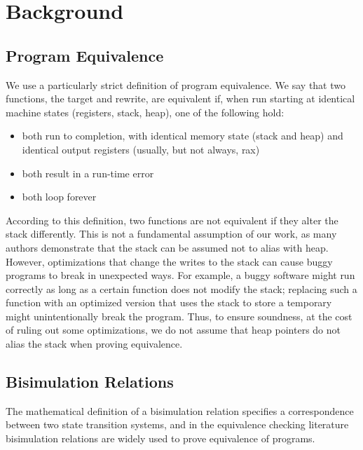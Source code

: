 \section{Background}

\subsection{Program Equivalence}

We use a particularly strict definition of program equivalence. We say
that two \arch{} functions, the target and rewrite, are equivalent
if, when run starting at identical machine states (registers, stack,
heap), one of the following hold:

\begin{itemize}
\item both run to completion, with identical memory state (stack and heap) and identical output registers (usually, but not always, rax)
\item both result in a run-time error
\item both loop forever
\end{itemize}

According to this definition, two \arch{} functions are not equivalent
if they alter the stack differently. This is not a fundamental
assumption of our work, as many authors  demonstrate
that the stack can be assumed not to alias with heap. However,
optimizations that change the writes to the stack can cause buggy
programs to break in unexpected ways. For example, a buggy software
might run correctly as long as a certain function does not modify
the stack; replacing such a function with an optimized version that
uses the stack to store a temporary might unintentionally break the
program. Thus, to ensure soundness, at the cost of ruling out some
optimizations, we do not assume that heap pointers do not alias the
stack when proving equivalence.

\subsection{Bisimulation Relations}

The mathematical definition of a bisimulation relation specifies
a correspondence between two state transition systems, and in the
equivalence checking literature bisimulation relations are widely
used to prove equivalence of programs. 

